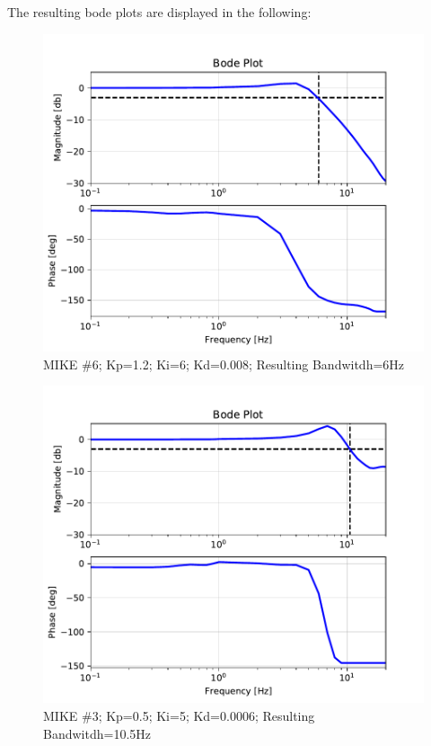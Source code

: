 The resulting bode plots are displayed in the following:

\begin{figure}[h]
    \centering
    \includegraphics[width = \textwidth]{chapters/position_bandwidth/Mike6_Bode_Plot.pdf}
    \caption{MIKE \#6; Kp=1.2; Ki=6; Kd=0.008; Resulting Bandwitdh=6Hz}
    \label{fig:my_label}
\end{figure}

\begin{figure}[h]
    \centering
    \includegraphics[width = \textwidth]{chapters/position_bandwidth/Mike3_Bode_Plot.pdf}
    \caption{MIKE \#3; Kp=0.5; Ki=5; Kd=0.0006; Resulting Bandwitdh=10.5Hz}
    \label{fig:my_label}
\end{figure}